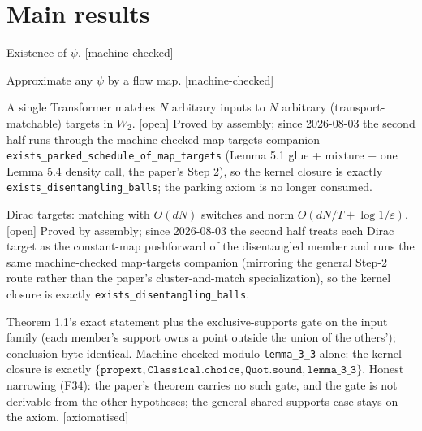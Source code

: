 \section{Main results}

\begin{lemma}\label{lem:51}Existence of $\psi$. [machine-checked]\end{lemma}
\begin{lemma}[$L^2$ approximation, 5.4]\label{lem:54}\leanok Approximate any $\psi$ by a flow map. [machine-checked]\end{lemma}

\begin{theorem}[Theorem 1.2]\label{thm:12}
A single Transformer matches $N$ arbitrary inputs to $N$ arbitrary (transport-matchable) targets in $W_2$. [open]
Proved by assembly; since 2026-08-03 the second half runs through the machine-checked map-targets
companion \texttt{exists\_parked\_schedule\_of\_map\_targets} (Lemma 5.1 glue + mixture + one
Lemma 5.4 density call, the paper's Step 2), so the kernel closure is exactly
\texttt{exists\_disentangling\_balls}; the parking axiom is no longer consumed.
\end{theorem}

\begin{theorem}[Theorem 1.1]\label{thm:11}
Dirac targets: matching with $O(dN)$ switches and norm $O(dN/T+\log 1/\varepsilon)$. [open]
Proved by assembly; since 2026-08-03 the second half treats each Dirac target as the constant-map
pushforward of the disentangled member and runs the same machine-checked map-targets companion
(mirroring the general Step-2 route rather than the paper's cluster-and-match specialization), so
the kernel closure is exactly \texttt{exists\_disentangling\_balls}.
\end{theorem}

\begin{theorem}\label{thm:11x}
Theorem 1.1's exact statement plus the exclusive-supports gate on the input family (each member's
support owns a point outside the union of the others'); conclusion byte-identical. Machine-checked
modulo \texttt{lemma\_3\_3} alone: the kernel closure is exactly
$\{\texttt{propext}, \texttt{Classical.choice}, \texttt{Quot.sound}, \texttt{lemma\_3\_3}\}$.
Honest narrowing (F34): the paper's theorem carries no such gate, and the gate is not derivable
from the other hypotheses; the general shared-supports case stays on the axiom. [axiomatised]
\end{theorem}

